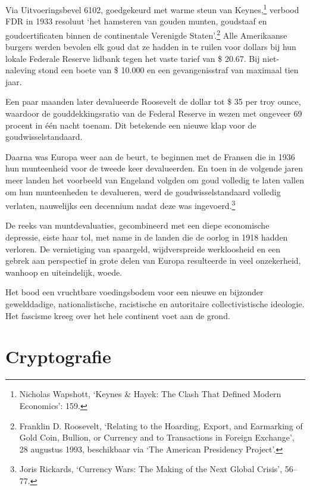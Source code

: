 \documentclass[smalldemyvopaper,11pt,twoside,onecolumn,openright,extrafontsizes,hidelinks]{memoir}
\begin{document}
Via Uitvoeringsbevel 6102, goedgekeurd met warme steun van
Keynes,\footnote{\hspace{0pt}Nicholas Wapshott, `Keynes \& Hayek: The
  Clash That Defined Modern Economics': 159.} verbood FDR in 1933
resoluut `het hamsteren van gouden munten, goudstaaf en goudcertificaten
binnen de continentale Verenigde Staten'.\footnote{\hspace{0pt}Franklin
  D. Roosevelt, `Relating to the Hoarding, Export, and Earmarking of
  Gold Coin, Bullion, or Currency and to Transactions in Foreign
  Exchange', 28 augustus 1993, beschikbaar via `The American Presidency
  Project'.} Alle Amerikaanse burgers werden bevolen elk goud dat ze
hadden in te ruilen voor dollars bij hun lokale Federale Reserve lidbank
tegen het vaste tarief van \$ 20.67. Bij niet-naleving stond een boete
van \$ 10.000 en een gevangenisstraf van maximaal tien jaar.

Een paar maanden later devalueerde Roosevelt de dollar tot \$ 35 per
troy ounce, waardoor de gouddekkingsratio van de Federal Reserve in
wezen met ongeveer 69 procent in één nacht toenam. Dit betekende een
nieuwe klap voor de goudwisselstandaard.

Daarna was Europa weer aan de beurt, te beginnen met de Fransen die in
1936 hun munteenheid voor de tweede keer devalueerden. En toen in de
volgende jaren meer landen het voorbeeld van Engeland volgden om goud
volledig te laten vallen om hun munteenheden te devalueren, werd de
goudwisselstandaard volledig verlaten, nauwelijks een decennium nadat
deze was ingevoerd.\footnote{\hspace{0pt}Joris Rickards, `Currency Wars:
  The Making of the Next Global Crisis', 56--77.}

De reeks van muntdevaluaties, gecombineerd met een diepe economische
depressie, eiste haar tol, met name in de landen die de oorlog in 1918
hadden verloren. De vernietiging van spaargeld, wijdverspreide
werkloosheid en een gebrek aan perspectief in grote delen van Europa
resulteerde in veel onzekerheid, wanhoop en uiteindelijk, woede.

Het bood een vruchtbare voedingsbodem voor een nieuwe en bijzonder
gewelddadige, nationalistische, racistische en autoritaire
collectivistische ideologie. Het fascisme kreeg over het hele continent
voet aan de grond.

\chapter{Cryptografie}\label{cryptografie}
\end{document}
